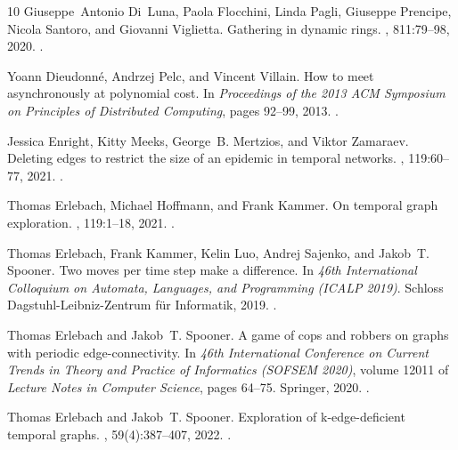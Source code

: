 \documentclass[10pt,a4paper]{article}
\begin{document}
\begin{thebibliography}{10}
Giuseppe~Antonio Di~Luna, Paola Flocchini, Linda Pagli, Giuseppe Prencipe,
  Nicola Santoro, and Giovanni Viglietta.
\newblock Gathering in dynamic rings.
, 811:79--98, 2020.
\newblock \href {https://doi.org/10.1016/j.tcs.2018.10.018}
  {}.

Yoann Dieudonn{\'e}, Andrzej Pelc, and Vincent Villain.
\newblock How to meet asynchronously at polynomial cost.
\newblock In {\em Proceedings of the 2013 ACM Symposium on Principles of
  Distributed Computing}, pages 92--99, 2013.
\newblock \href {https://doi.org/10.1137/130931990}
  {}.

Jessica Enright, Kitty Meeks, George~B. Mertzios, and Viktor Zamaraev.
\newblock Deleting edges to restrict the size of an epidemic in temporal
  networks.
, 119:60--77, 2021.
\newblock \href {https://doi.org/10.1016/j.jcss.2021.01.007}
  {}.

Thomas Erlebach, Michael Hoffmann, and Frank Kammer.
\newblock On temporal graph exploration.
, 119:1--18, 2021.
\newblock \href {https://doi.org/10.1016/j.jcss.2021.01.005}
  {}.

Thomas Erlebach, Frank Kammer, Kelin Luo, Andrej Sajenko, and Jakob~T. Spooner.
\newblock Two moves per time step make a difference.
\newblock In {\em 46th International Colloquium on Automata, Languages, and
  Programming (ICALP 2019)}. Schloss Dagstuhl-Leibniz-Zentrum f{\"u}r
  Informatik, 2019.
\newblock \href {https://doi.org/10.4230/LIPIcs.ICALP.2019.141}
  {}.

Thomas Erlebach and Jakob~T. Spooner.
\newblock A game of cops and robbers on graphs with periodic edge-connectivity.
\newblock In {\em 46th International Conference on Current Trends in Theory and
  Practice of Informatics (SOFSEM 2020)}, volume 12011 of {\em Lecture Notes in
  Computer Science}, pages 64--75. Springer, 2020.
\newblock \href {https://doi.org/10.1007/978-3-030-38919-2\_6}
  {}.

Thomas Erlebach and Jakob~T. Spooner.
\newblock Exploration of k-edge-deficient temporal graphs.
, 59(4):387--407, 2022.
\newblock \href {https://doi.org/10.1007/s00236-022-00421-5}
  {}.


\end{thebibliography}
\end{document}
